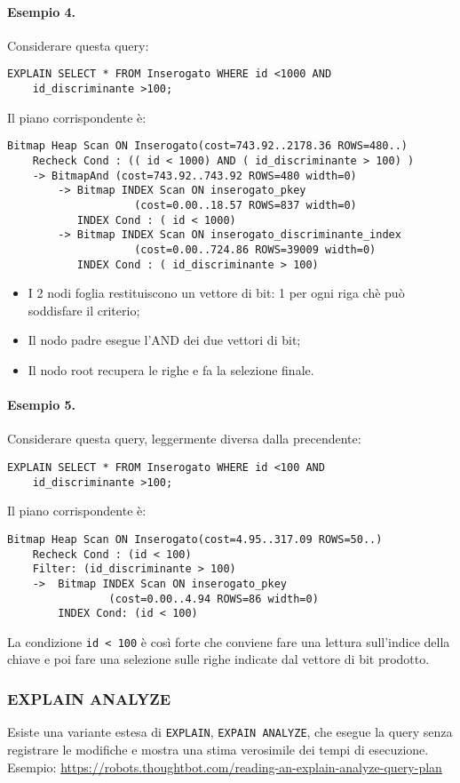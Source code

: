 \documentclass[a4paper, 10pt, titlepage]{article}
\begin{document}
\paragraph{Esempio 4.}
		Considerare questa query:
	\begin{lstlisting}
EXPLAIN SELECT * FROM Inserogato WHERE id <1000 AND
	id_discriminante >100;
	\end{lstlisting}
	Il piano corrispondente è:
	\begin{lstlisting}
Bitmap Heap Scan ON Inserogato(cost=743.92..2178.36 ROWS=480..)
	Recheck Cond : (( id < 1000) AND ( id_discriminante > 100) )
	-> BitmapAnd (cost=743.92..743.92 ROWS=480 width=0)
		-> Bitmap INDEX Scan ON inserogato_pkey
					(cost=0.00..18.57 ROWS=837 width=0)
		   INDEX Cond : ( id < 1000)
		-> Bitmap INDEX Scan ON inserogato_discriminante_index
					(cost=0.00..724.86 ROWS=39009 width=0)
		   INDEX Cond : ( id_discriminante > 100)
	\end{lstlisting}
	\begin{itemize}
	\item I 2 nodi foglia restituiscono un vettore di bit: 1 per ogni riga chè può soddisfare il criterio;
	\item Il nodo padre esegue l'AND dei due vettori di bit;
	\item Il nodo root recupera le righe e fa la selezione finale.
	\end{itemize}  
	
	\paragraph{Esempio 5.}
		Considerare questa query, leggermente diversa dalla precendente:
	\begin{lstlisting}
EXPLAIN SELECT * FROM Inserogato WHERE id <100 AND
	id_discriminante >100;
	\end{lstlisting}
	Il piano corrispondente è:
	\begin{lstlisting}
Bitmap Heap Scan ON Inserogato(cost=4.95..317.09 ROWS=50..)
	Recheck Cond : (id < 100) 
	Filter: (id_discriminante > 100)
	->  Bitmap INDEX Scan ON inserogato_pkey 
				(cost=0.00..4.94 ROWS=86 width=0)
		INDEX Cond: (id < 100)
	\end{lstlisting} \medskip
	La condizione \lstinline|id < 100| è così forte che conviene fare una lettura sull’indice della chiave e poi fare una selezione sulle righe indicate dal vettore di bit prodotto.
	  
	
	\subsubsection*{EXPLAIN ANALYZE}
	Esiste una variante estesa di \lstinline|EXPLAIN|, \lstinline|EXPAIN ANALYZE|, che esegue la query senza registrare le modifiche e mostra una stima verosimile dei tempi di esecuzione.\\
	Esempio:
	\url{https://robots.thoughtbot.com/reading-an-explain-analyze-query-plan}
\end{document}
